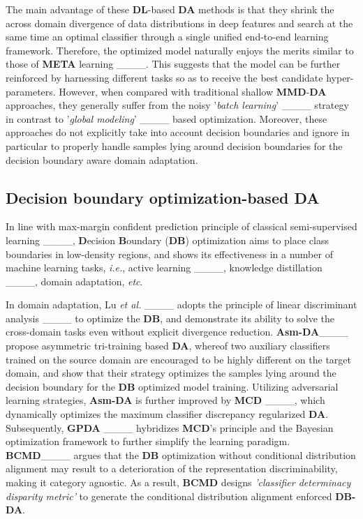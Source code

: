 The main advantage of these \textbf{DL}-based \textbf{DA} methods is that they  shrink the across domain divergence of data distributions in deep features  and search at the same time an optimal classifier through a single unified end-to-end learning framework. Therefore, the optimized model naturally enjoys the merits similar to those of \textbf{META} learning ____. This suggests that the model can be further reinforced by harnessing different tasks so as to receive the best candidate hyper-parameters. However, when compared with traditional shallow \textbf{MMD}-\textbf{DA} approaches, they generally suffer from the noisy '\textit{batch learning}' ____ strategy in contrast to '\textit{global modeling}' ____ based optimization. Moreover, these approaches do not explicitly take into account decision boundaries  and ignore in particular to properly handle samples lying around decision boundaries for the decision boundary aware domain adaptation.







\subsection{Decision boundary optimization-based \textbf{DA}}
\label{subsect: Decision boundary optimization-based DA}

In line with max-margin confident prediction principle of classical semi-supervised learning ____, \textbf{D}ecision \textbf{B}oundary (\textbf{DB}) optimization aims to place class boundaries in low-density regions,  and shows its effectiveness in a number of machine learning tasks, \textit{i.e.}, active learning ____, knowledge distillation ____, domain adaptation, \textit{etc}. 

In domain adaptation, Lu \textit{et al.} ____ adopts the principle of linear discriminant analysis ____ to optimize the \textbf{DB}, and demonstrate its ability to solve the cross-domain tasks even without explicit divergence reduction. \textbf{Asm-DA}____  propose asymmetric tri-training based \textbf{DA}, whereof  two auxiliary classifiers  trained on the source domain are encouraged to be highly different on the target domain, and show that their strategy optimizes the samples lying around the decision boundary for the \textbf{DB} optimized model training. Utilizing adversarial learning strategies, \textbf{Asm-DA} is further  improved by \textbf{MCD} ____, which dynamically optimizes the maximum classifier discrepancy regularized \textbf{DA}. Subsequently, \textbf{GPDA} ____ hybridizes \textbf{MCD}’s principle and the Bayesian optimization framework to further simplify the learning paradigm. \textbf{BCMD}____ argues that the \textbf{DB} optimization without conditional distribution alignment may result to a deterioration of the representation discriminability, making it category agnostic. As a result, \textbf{BCMD} designs \textit{'classifier determinacy disparity metric'} to generate the conditional distribution alignment enforced \textbf{DB-DA}.




